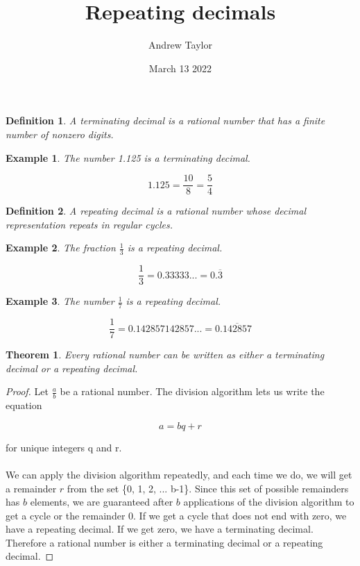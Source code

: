 \documentclass{article}
\title{Repeating decimals}
\author{Andrew Taylor}
\date{March 13 2022}
\newtheorem{definition}{Definition}
\newtheorem{theorem}{Theorem}
\newtheorem{example}{Example}
\begin{document}
\maketitle

\begin{definition}
A terminating decimal is a rational number that has a finite number of nonzero digits.
\end{definition}

\begin{example}
The number 1.125 is a terminating decimal. 

\begin{equation*}
1.125 = \frac{10}{8} = \frac{5}{4}
\end{equation*}

\end{example}

\begin{definition}
A repeating decimal is a rational number whose decimal representation repeats in regular cycles.
\end{definition}

\begin{example}
The fraction $\displaystyle \frac{1}{3}$ is a repeating decimal.

\begin{equation*}
\frac{1}{3} = 0.33333... = 0.\overline{3}
\end{equation*}

\end{example}

\begin{example}
The number $\displaystyle \frac{1}{7}$ is a repeating decimal.
\end{example}

\begin{equation*}
\frac{1}{7} = 0.142857142857... = 0.\overline{142857}
\end{equation*}

\begin{theorem}
Every rational number can be written as either a terminating decimal or a repeating decimal.
\end{theorem}

\begin{proof}
Let $\displaystyle \frac{a}{b}$ be a rational number. The division algorithm lets us write the equation 

\begin{equation*}
a = bq + r
\end{equation*}

for unique integers q and r.
\\
\\
We can apply the division algorithm repeatedly, and each time we do, we will get a remainder $r$ from the set \{0, 1, 2, ... b-1\}. Since this set of possible remainders has $b$ elements, we are guaranteed after $b$ applications of the division algorithm to get a cycle or the remainder 0. If we get a cycle that does not end with zero, we have a repeating decimal. If we get zero, we have a terminating decimal. Therefore a rational number is either a terminating decimal or a repeating decimal.
\end{proof}
\end{document}
